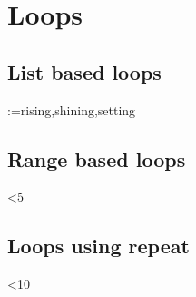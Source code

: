 \chapter{Loops}

\section{List based loops}
\makeatletter
\@for\sun:={rising,shining,setting}
\makeatother

\section{Range based loops}
\makeatletter
{}
\@whilenum\value{int}<5\do
{\ifthenelse{\isodd{\value{int}}}{\theint}{}}
\makeatother

\section{Loops using repeat}
\setcounter{int}{1}
\loop
\theint
\addtocounter{int}{2}
\ifnum \value{int}<10
    \repeat

